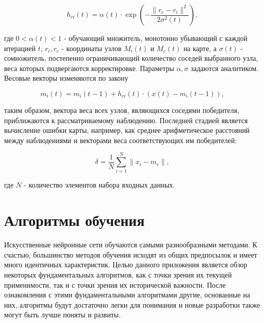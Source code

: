 \documentclass[a4paper,12pt]{report}
\begin{document}
\begin{equation}
h_{ci}(t)=\alpha (t)\cdot\exp\left(-\frac{\|r_c-r_i\|^2}{2\sigma^2(t)}\right),
\end{equation}

где $0<\alpha(t)<1$ - обучающий множитель, монотонно убывающий с каждой итерацией $t$, $r_i,r_c$ - координаты узлов $M_i(t)$ и $M_c(t)$ на карте, а $\sigma (t)$ - сомножитель, постепенно ограничивающий количество соседей выбранного узла, веса которых подвергаются корректировке. Параметры $\alpha, \sigma$ задаются аналитиком. Весовые векторы изменяются по закону

\begin{equation}
m_i(t)=m_i(t-1)+h_{ci}(t)\cdot (x(t) - m_i(t-1)),
\end{equation} 

таким образом, вектора веса всех узлов, являющихся соседями победителя, приближаются к рассматриваемому наблюдению. Последней стадией является вычисление ошибки карты, например, как среднее арифметическое расстояний между наблюдениями и векторами веса соответствующих им победителей:

\begin{equation}
\delta=\frac{1}{N}\sum_{i=1}^N \|x_i-m_c\|,
\end{equation} 

где $N$ - количество элементов набора входных данных.

\section{Алгоритмы обучения}

Искусственные нейронные сети обучаются самыми разнообразными методами. К счастью, большинство методов обучения исходят из общих предпосылок и имеет много идентичных характеристик. Целью данного приложения является обзор некоторых фундаментальных алгоритмов, как с точки зрения их текущей применимости, так и с точки зрения их исторической важности. После ознакомления с этими фундаментальными алгоритмами другие, основанные на них, алгоритмы будут 
достаточно легки для понимания и новые разработки также могут быть лучше поняты и развиты. 
\end{document}
